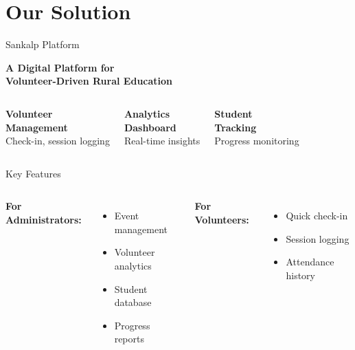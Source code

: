 \documentclass[aspectratio=169]{beamer}
\begin{document}
\section{Our Solution}

\begin{frame}{Sankalp Platform}
    \begin{center}
        \Large\textbf{A Digital Platform for}\\
        \Large\textbf{Volunteer-Driven Rural Education}
    \end{center}
    
    \vspace{2em}
    
    \begin{columns}
        \centering
        \textbf{Volunteer\\Management}\\
        \small Check-in, session logging
        
        \centering
        \textbf{Analytics\\Dashboard}\\
        \small Real-time insights
        
        \centering
        \textbf{Student\\Tracking}\\
        \small Progress monitoring
    \end{columns}
\end{frame}

\begin{frame}{Key Features}
    \begin{columns}
        \textbf{For Administrators:}
        \begin{itemize}
            \item Event management
            \item Volunteer analytics
            \item Student database
            \item Progress reports
        \end{itemize}
        
        \vspace{1em}
        
        \textbf{For Volunteers:}
        \begin{itemize}
            \item Quick check-in
            \item Session logging
            \item Attendance history
        \end{itemize}
        
        \centering
    \end{columns}
\end{frame}
\end{document}
